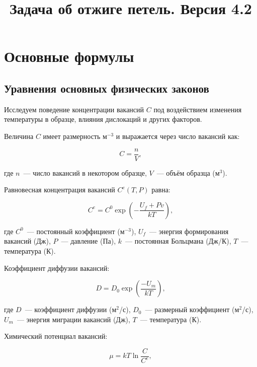 \documentclass[12pt, a4paper]{article}
\begin{document}
\title{Задача об отжиге петель. Версия 4.2}
\maketitle

\section{Основные формулы}

\subsection{Уравнения основных физических законов}

Исследуем поведение концентрации вакансий $C$ под воздействием изменения температуры в образце, влияния дислокаций и других факторов.

Величина $C$ имеет размерность м${}^{-3}$ и выражается через число вакансий как:

\begin{equation}
\label{c_by_n}
C = \frac{n}{V},
\end{equation}

\noindent где $n$~--- число вакансий в некотором образце, $V$~--- объём образца (м${}^3$).

Равновесная концентрация вакансий $C^e(T, P)$ равна:

\begin{equation}
\label{eq_eq_c}
C^e = C^0 \exp \left(-\frac{U_f + Pv}{kT} \right),
\end{equation}

\noindent где $C^0$~--- постоянный коэффициент (м${}^{-3}$), $U_f$~--- энергия формирования вакансий (Дж), $P$~--- давление (Па), $k$~--- постоянная Больцмана (Дж/К), $T$~--- температура (К).

Коэффициент диффузии вакансий:

\begin{equation}
\label{eq_diffusion}
D = D_0 \exp \left( \frac{-U_m}{kT} \right),
\end{equation}

\noindent где $D$~--- коэффициент диффузии (м${}^2$/с), $D_0$~--- размерный коэффициент (м${}^2$/с), $U_m$~--- энергия миграции вакансий (Дж), $T$~--- температура (К).

Химический потенциал вакансий:

\begin{equation}
\label{eq_mu}
\mu = kT \ln{\frac{C}{C^e}},
\end{equation}
\end{document}

